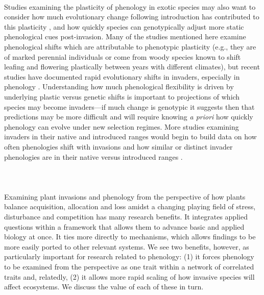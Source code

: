 \documentclass[11pt,a4paper,oneside]{article}
\begin{document}
\\
Studies examining the plasticity of phenology in exotic species may also want to consider how much evolutionary change following introduction has contributed to this plasticity \citep[e.g.,][]{sultan2013}, and how quickly species can genotypically adjust more static phenological cues post-invasion. Many of the studies mentioned here examine phenological shifts which are attributable to phenotypic plasticity (e.g., they are of marked perennial individuals or come from woody species known to shift leafing and flowering plastically between years with different climates), but recent studies have documented rapid evolutionary shifts in invaders, especially in phenology \citep[e.g.,][]{Colautti:2011,konarz2012,novy2012}. Understanding how much phenological flexibility is driven by underlying plastic versus genetic shifts is important to projections of which species may become invaders---if much change is genotypic it suggests then that predictions may be more difficult and will require knowing \emph{a priori} how quickly phenology can evolve under new selection regimes. More studies examining invaders in their native and introduced ranges \citep[e.g.,][]{Godoy:2009dz,matesanz2012} would begin to build data on how often phenologies shift with invasions and how similar or distinct invader phenologies are in their native versus introduced ranges \citep[e.g.,][]{wolkovichAmBot2013}.\\
\\
\\
\\
Examining plant invasions and phenology from the perspective of how plants balance acquisition, allocation and loss amidst a changing playing field of stress, disturbance and competition has many research benefits. It integrates applied questions within a framework that allows them to advance basic and applied biology at once. It ties more directly to mechanisms, which allows findings to be more easily ported to other relevant systems. We see two benefits, however, as particularly important for research related to phenology: (1)  it forces phenology to be examined from the perspective as one trait within a network of correlated traits and, relatedly, (2) it allows more rapid scaling of how invasive species will affect ecosystems. We discuss the value of each of these in turn.\\
\\
\end{document}
